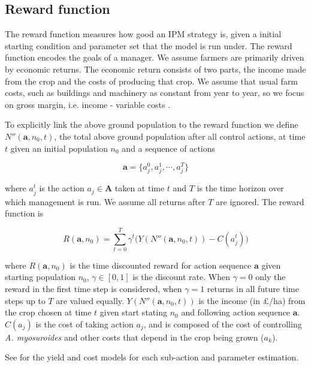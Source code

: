 \documentclass[12pt, a4paper]{article}
\begin{document}
\subsection*{Reward function}
The reward function measures how good an IPM strategy is, given a initial starting condition and parameter set that the model is run under. The reward function encodes the goals of a manager. We assume farmers are primarily driven by economic returns. The economic return consists of two parts, the income made from the crop and the costs of producing that crop. We assume that usual farm costs, such as buildings and machinery as constant from year to year, so we focus on gross margin, i.e. income - variable costs \citep[pp.~3--4]{Nix2016}. 

To explicitly link the above ground population to the reward function we define $N''(\mathbf{a}, n_0, t)$, the total above ground population after all control actions, at time $t$ given an initial population $n_0$ and a sequence of actions 
\begin{linenomath*}
\begin{equation}
	\mathbf{a} = \{a_j^0, a_j^1, \cdots, a_j^T\}
\end{equation}	  
\end{linenomath*} 
where $a_j^t$ is the action $a_j \in \mathbf{A}$ taken at time $t$ and $T$ is the time horizon over which management is run. We assume all returns after $T$ are ignored. The reward function is  
\begin{linenomath*}
\begin{equation}
	R(\mathbf{a}, n_0) = \sum_{t=0}^T \gamma^t \Big( Y(N''(\mathbf{a}, n_0, t)) - C(a_j^t) \Big)
\end{equation}
\end{linenomath*}
where $R(\mathbf{a}, n_0)$ is the time discounted reward for action sequence $\mathbf{a}$ given starting population $n_0$, $\gamma \in [0, 1]$ is the discount rate. When $\gamma = 0$ only the reward in the first time step is considered, when $\gamma = 1$ returns in all future time steps up to $T$ are valued equally. $Y(N''(\mathbf{a}, n_0, t))$ is the income (in \pounds /ha) from the crop chosen at time $t$ given start stating $n_0$ and following action sequence $\mathbf{a}$. $C(a_j)$ is the cost of taking action $a_j$, and is composed of the cost of controlling \textit{A. myosuroides} and other costs that depend in the crop being grown ($a_k$).   

See  for the yield and cost models for each sub-action and parameter estimation.
\end{document}
